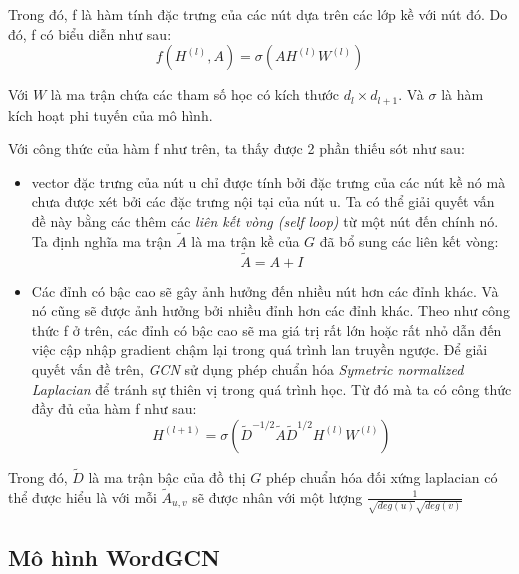 Trong đó, f là hàm tính đặc trưng của các nút dựa trên các lớp kề với nút đó. Do đó, f có biểu diễn như sau:
\begin{equation*}
	f(H^{(l)}, A) = \sigma(AH^{(l)}W^{(l)})
\end{equation*}

Với $W$ là ma trận chứa các tham số học có kích thước $d_l \times d_{l+1}$. Và $\sigma$ là hàm kích hoạt phi tuyến của mô hình. 

Với công thức của hàm f như trên, ta thấy được 2 phần thiếu sót như sau:
\begin{itemize}
	\item vector đặc trưng của nút u chỉ được tính bởi đặc trưng của các nút kề nó mà chưa được xét bởi các đặc trưng nội tại của nút u. Ta có thể giải quyết vấn đề này bằng các thêm các \textit{liên kết vòng (self loop)} từ một nút đến chính nó. Ta định nghĩa ma trận $\tilde{A}$ là ma trận kề của $G$ đã bổ sung các liên kết vòng:
	\begin{equation*}
		\tilde{A} = A + I
	\end{equation*} 
	\item Các đỉnh có bậc cao sẽ gây ảnh hưởng đến nhiều nút hơn các đỉnh khác. Và nó cũng sẽ được ảnh hưởng bởi nhiều đỉnh hơn các đỉnh khác. Theo như công thức f ở trên, các đỉnh có bậc cao sẽ ma giá trị rất lớn hoặc rất nhỏ dẫn đến việc cập nhập gradient chậm lại trong quá trình lan truyền ngược. Để giải quyết vấn đề trên, \textit{GCN} sử dụng phép chuẩn hóa \textit{Symetric normalized Laplacian} để tránh sự thiên vị trong quá trình học.
	Từ đó mà ta có công thức đầy đủ của hàm f như sau:
	\begin{equation*}
		H^{(l+1)} = \sigma(\tilde{D}^{-1/2}\tilde{A}\tilde{D}^{1/2}H^{(l)}W^{(l)})
	\end{equation*}
\end{itemize}

Trong đó, $\tilde{D}$ là ma trận bậc của đồ thị $G$ phép chuẩn hóa đối xứng laplacian có thể được hiểu là với mỗi $\tilde{A}_{u,v}$ sẽ được nhân với một lượng $\frac{1}{\sqrt{deg(u)}\sqrt{deg(v)}}$


\subsection{Mô hình WordGCN}

